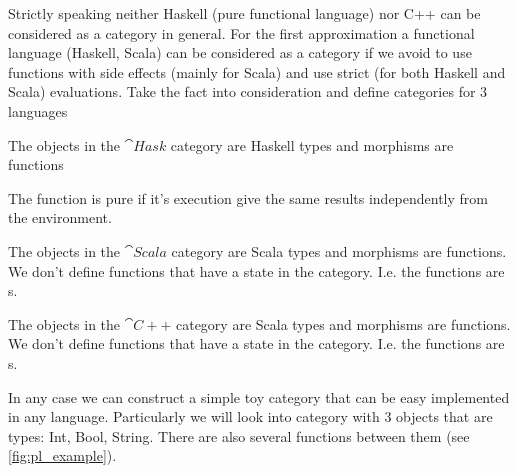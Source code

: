 Strictly speaking neither Haskell (pure functional language) nor C++
can be considered as a category in general. For the first approximation
a functional language (Haskell, Scala) can be considered as a
category if we avoid to use functions with side effects (mainly for
Scala) and use strict (for both Haskell and Scala) evaluations. Take
the fact into consideration and define categories for 3 languages

\begin{definition}
\label{def:haskcategory}
The objects in the $\cat{Hask}$ category are Haskell types and
morphisms are functions
\end{definition}

\begin{definition}
\label{def:pure_function}
The function is pure if it's execution give the same results
independently from the environment. 
\end{definition}

\begin{definition}
\label{def:scalacategory}
The objects in the $\cat{Scala}$ category are Scala types and
morphisms are functions. We don't define functions that have a state
in the category. I.e. the functions are s. 
\end{definition}

\begin{definition}
\label{def:cppcategory}
The objects in the $\cat{C++}$ category are Scala types and
morphisms are functions. We don't define functions that have a state
in the category. I.e. the functions are s. 
\end{definition}


In any case we can construct a simple toy category that can be easy
implemented in any language. Particularly we will look into category
with 3 objects that are types: Int, Bool, String. There are also
several functions between them (see \cref{fig:pl_example}).   

